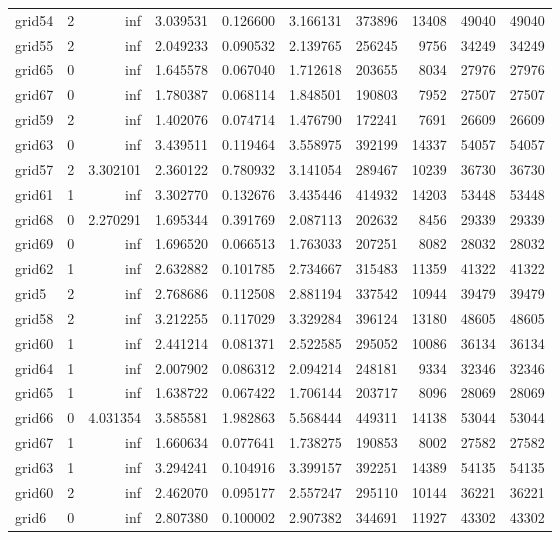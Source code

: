 \documentclass[../../../thesis.tex]{subfiles}
\begin{document}
\begin{longtable}{|l|r|r|r|r|r|r|r|r|r|}
grid54 & 2 & inf & 3.039531 & 0.126600 & 3.166131 & 373896 & 13408 & 49040 & 49040 \\
grid55 & 2 & inf & 2.049233 & 0.090532 & 2.139765 & 256245 & 9756 & 34249 & 34249 \\
grid65 & 0 & inf & 1.645578 & 0.067040 & 1.712618 & 203655 & 8034 & 27976 & 27976 \\
grid67 & 0 & inf & 1.780387 & 0.068114 & 1.848501 & 190803 & 7952 & 27507 & 27507 \\
grid59 & 2 & inf & 1.402076 & 0.074714 & 1.476790 & 172241 & 7691 & 26609 & 26609 \\
grid63 & 0 & inf & 3.439511 & 0.119464 & 3.558975 & 392199 & 14337 & 54057 & 54057 \\
grid57 & 2 & 3.302101 & 2.360122 & 0.780932 & 3.141054 & 289467 & 10239 & 36730 & 36730 \\
grid61 & 1 & inf & 3.302770 & 0.132676 & 3.435446 & 414932 & 14203 & 53448 & 53448 \\
grid68 & 0 & 2.270291 & 1.695344 & 0.391769 & 2.087113 & 202632 & 8456 & 29339 & 29339 \\
grid69 & 0 & inf & 1.696520 & 0.066513 & 1.763033 & 207251 & 8082 & 28032 & 28032 \\
grid62 & 1 & inf & 2.632882 & 0.101785 & 2.734667 & 315483 & 11359 & 41322 & 41322 \\
grid5 & 2 & inf & 2.768686 & 0.112508 & 2.881194 & 337542 & 10944 & 39479 & 39479 \\
grid58 & 2 & inf & 3.212255 & 0.117029 & 3.329284 & 396124 & 13180 & 48605 & 48605 \\
grid60 & 1 & inf & 2.441214 & 0.081371 & 2.522585 & 295052 & 10086 & 36134 & 36134 \\
grid64 & 1 & inf & 2.007902 & 0.086312 & 2.094214 & 248181 & 9334 & 32346 & 32346 \\
grid65 & 1 & inf & 1.638722 & 0.067422 & 1.706144 & 203717 & 8096 & 28069 & 28069 \\
grid66 & 0 & 4.031354 & 3.585581 & 1.982863 & 5.568444 & 449311 & 14138 & 53044 & 53044 \\
grid67 & 1 & inf & 1.660634 & 0.077641 & 1.738275 & 190853 & 8002 & 27582 & 27582 \\
grid63 & 1 & inf & 3.294241 & 0.104916 & 3.399157 & 392251 & 14389 & 54135 & 54135 \\
grid60 & 2 & inf & 2.462070 & 0.095177 & 2.557247 & 295110 & 10144 & 36221 & 36221 \\
grid6 & 0 & inf & 2.807380 & 0.100002 & 2.907382 & 344691 & 11927 & 43302 & 43302 \\

\end{longtable}
\end{document}
